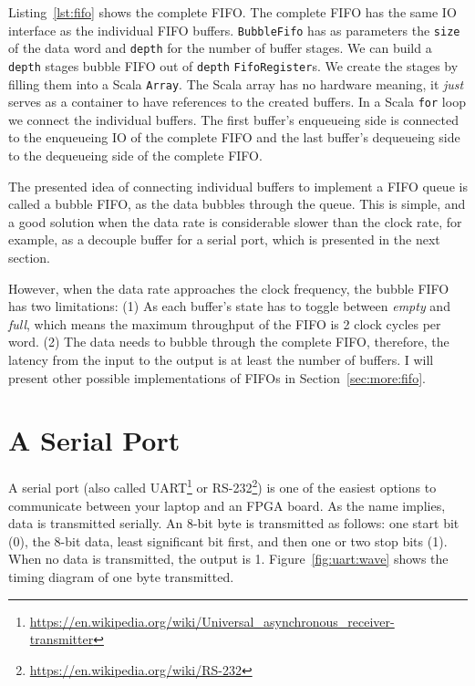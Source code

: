 \documentclass[%
    10pt,
    headinclude, footexclude,
    openright, %
    notitlepage,
    cleardoubleempty,
    headsepline,
    pointlessnumbers,
    bibtotoc, idxtotoc,
    ]{scrbook}
\newcommand{\code}[1]{{\lstinline[basicstyle=\small\ttfamily]{#1}}}
\newcommand{\myref}[2]{\href{#1}{#2}}
\renewcommand{\myref}[2]{{#2}{\footnote{\url{#1}}}}
\begin{document}
Listing~\ref{lst:fifo} shows the complete FIFO. The complete FIFO has
the same IO interface as the individual FIFO buffers.
\code{BubbleFifo} has as parameters the \code{size} of the data
word and \code{depth} for the number of buffer stages.
We can build a \code{depth} stages bubble FIFO out of \code{depth}
\code{FifoRegister}s. We create the stages by filling them into a Scala \code{Array}.
The Scala array has no hardware meaning, it \emph{just} serves as
a container to have references to the created buffers.
In a Scala \code{for} loop we connect the individual buffers.
The first buffer's enqueueing side is connected to the enqueueing IO of
the complete FIFO and the last buffer's dequeueing side to the
dequeueing side of the complete FIFO.


The presented idea of connecting individual buffers to implement a FIFO
queue is called a bubble FIFO, as the data bubbles through the queue.
This is simple, and a good solution when the data rate is considerable slower
than the clock rate, for example, as a decouple buffer for a serial port, which is presented
in the next section.

However, when the data rate approaches the clock frequency, the bubble FIFO
has two limitations: (1) As each buffer's state has to toggle between \emph{empty} and
\emph{full}, which means the maximum throughput of the FIFO is 2 clock cycles
per word. (2) The data needs to bubble through the complete FIFO, therefore,
the latency from the input to the output is at least the number of buffers.
I will present other possible implementations of FIFOs in Section~\ref{sec:more:fifo}.

\section{A Serial Port}
\label{sec:uart}

A serial port (also called
\myref{https://en.wikipedia.org/wiki/Universal_asynchronous_receiver-transmitter}{UART}
or \myref{https://en.wikipedia.org/wiki/RS-232}{RS-232}) is one of the easiest options
to communicate between your laptop and an FPGA board.
As the name implies, data is transmitted serially. An 8-bit byte is transmitted as follows:
one start bit (0), the 8-bit data, least significant bit first, and then one or two stop
bits (1). When no data is transmitted, the output is 1.
Figure~\ref{fig:uart:wave} shows the timing diagram of one byte transmitted.
\end{document}
